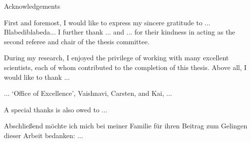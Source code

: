 
\cleardoublepage
\thispagestyle{empty}

{}

\begin{center}
{\color{maincolor2} \mainregular \Huge Acknowledgements} 
\end{center}
\vspace{1cm}

First and foremost, I would like to express my sincere gratitude to ... Blabediblabeda...
I further thank ... and ... for their kindness in acting as the second referee and chair of the thesis committee.

During my research, I enjoyed the privilege of working with many excellent scientists, each of whom contributed to the completion of this thesis.
Above all, I would like to thank ...

... `Office of Excellence', Vaishnavi, Carsten, and Kai, ...

A special thanks is also owed to ...

Abschlie\ss end m\"ochte ich mich bei meiner Familie f\"ur ihren Beitrag zum Gelingen dieser Arbeit bedanken: ...